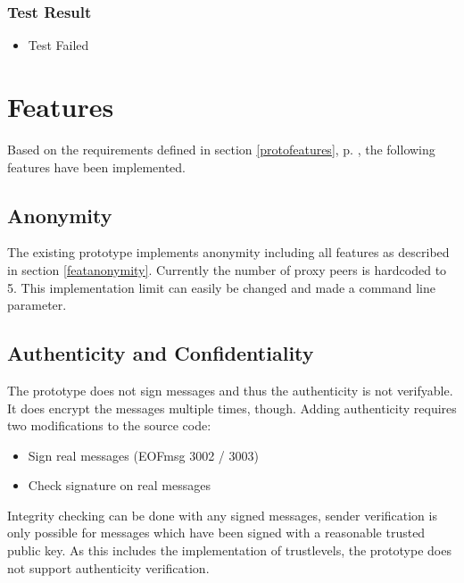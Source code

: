 \subsubsection{Test Result}
\begin{itemize}
\item Test Failed
\end{itemize}
\section{Features}
Based on the requirements defined in section \ref{protofeatures}, 
p. \pageref{protofeatures}, the following features have been implemented. 
\subsection{Anonymity}
The existing prototype implements anonymity including
all features as described in section \ref{featanonymity}.
Currently the number of proxy peers is hardcoded to 5. This implementation
limit can easily be changed and made a command line parameter.
\subsection{Authenticity and Confidentiality}
The prototype does not sign messages and thus the authenticity is not
verifyable. It does encrypt the messages multiple times, though.
Adding authenticity requires two modifications to the source code:
\begin{itemize}
\item Sign real messages (EOFmsg 3002 / 3003)
\item Check signature on real messages
\end{itemize}
Integrity checking can be done with any signed messages, sender verification
is only possible for messages which have been signed with a reasonable
trusted public key. As this includes the implementation of trustlevels, the
prototype does not support authenticity verification.
